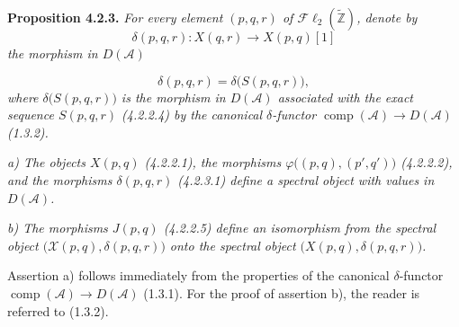 \medskip\noindent\textbf{Proposition 4.2.3.}\quad
\textit{For every element $(p,q,r)$ of
$\mathcal{F}\ell_2(\widetilde{\mathbb Z})$, denote by}
\[
\delta(p,q,r)\colon X(q,r)\longrightarrow X(p,q)[1]
\]
\noindent\textit{the morphism in $D(\mathcal A)$}

\begin{equation}
\delta(p,q,r)=\delta\bigl(S(p,q,r)\bigr),
\tag{4.2.3.1}
\end{equation}
\noindent\textit{where $\delta\bigl(S(p,q,r)\bigr)$ is the morphism in
$D(\mathcal A)$ associated with the exact sequence $S(p,q,r)$ (4.2.2.4)
by the canonical $\delta$-functor
$\operatorname{comp}(\mathcal A)\longrightarrow D(\mathcal A)$ (1.3.2).}

\noindent\textit{a) The objects $X(p,q)$ (4.2.2.1), the morphisms
$\varphi\bigl((p,q),(p',q')\bigr)$ (4.2.2.2), and the morphisms
$\delta(p,q,r)$ (4.2.3.1) define a spectral object with values in
$D(\mathcal A)$.}

\noindent\textit{b) The morphisms $J(p,q)$ (4.2.2.5) define an
isomorphism from the spectral object
$\bigl(\mathcal X(p,q),\delta(p,q,r)\bigr)$ onto the spectral object
$\bigl(X(p,q),\delta(p,q,r)\bigr)$.}

Assertion a) follows immediately from the properties of the canonical
$\delta$-functor
$\operatorname{comp}(\mathcal A)\longrightarrow D(\mathcal A)$ (1.3.1).
For the proof of assertion b), the reader is referred to (1.3.2).
\endgroup
